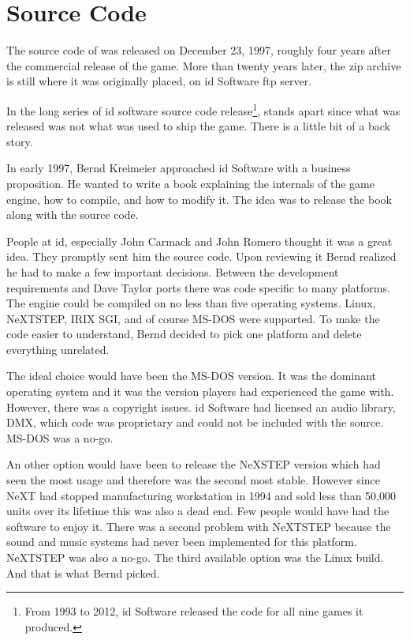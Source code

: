 \section{Source Code}
The source code of \doom{}was released on December 23, 1997, roughly four years after the commercial release of the game. More than twenty years later, the zip archive is still where it was originally placed, on id Software ftp server.\\
\par
{}
\par
 In the long series of id software source code release\footnote{From 1993 to 2012, id Software released the code for all nine games it produced.}, \doom{}stands apart since what was released was not what was used to ship the game. There is a little bit of a back story.\\
 \par
 In early 1997, Bernd Kreimeier approached id Software with a business proposition. He wanted to write a book explaining the internals of the game engine, how to compile, and how to modify it. The idea was to release the book along with the source code.\\
 \par
  People at id, especially John Carmack and John Romero thought it was a great idea. They promptly sent him the source code. Upon reviewing it Bernd realized he had to make a few important decisions. Between the development requirements and Dave Taylor ports there was code specific to many platforms. The engine could be compiled on no less than five operating systems. Linux, NeXTSTEP, IRIX SGI, and of course MS-DOS were supported. To make the code easier to understand, Bernd decided to pick one platform and delete everything unrelated.\\
  \par
  The ideal choice would have been the MS-DOS version. It was the dominant operating system and it was the version players had experienced the game with. However, there was a copyright issues. id Software had licensed an audio library, DMX, which code was proprietary and could not be included with the source. MS-DOS was a no-go.\\
  \par
   An other option would have been to release the NeXSTEP version which had seen the most usage and therefore was the second most stable. However since NeXT had stopped manufacturing workstation in 1994 and sold less than 50,000 units over its lifetime this was also a dead end. Few people would have had the software to enjoy it. There was a second problem with NeXTSTEP because the sound and music systems had never been implemented for this platform. NeXTSTEP was also a no-go. The third available option was the Linux build. And that is what Bernd picked.\\
